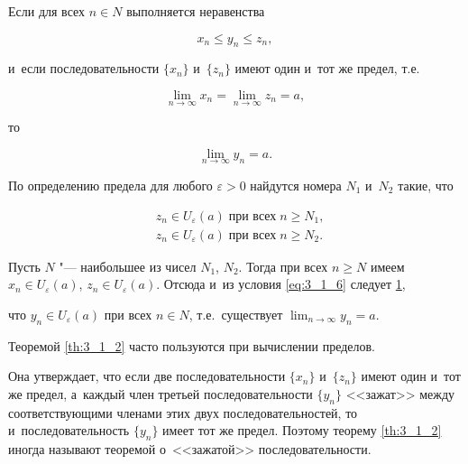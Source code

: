 
\begin{Th}\label{th:3_1_2}
Если  для всех $n \in N$ выполняется неравенства

\begin{equation}\label{eq:3_1_6}
x_{n} \leqslant y_{n} \leqslant z_{n},
\end{equation}

\noindent
и~если последовательности $\{x_{n}\}$ и~$\{z_{n}\}$ имеют один и~тот же предел,
т.е.\ 

\begin{equation*}
\displaystyle \lim_{n \to \infty} x_{n} = \lim_{n \to \infty} z_{n} = a, 
\end{equation*}

\noindent
то

\begin{equation*}
\displaystyle \lim_{n \to \infty} y_{n} = a.
\end{equation*}
\end{Th}

По определению предела для любого $\varepsilon > 0$ найдутся номера
$N_{1}$ и~$N_{2}$ такие, что

\begin{align*}
& z_{n} \in U_{\varepsilon}(a) \; \text{при всех} \; n \geqslant N_{1}, \\
& z_{n} \in U_{\varepsilon}(a) \; \text{при всех} \; n \geqslant N_{2}.
\end{align*}

\noindent
Пусть $N$ "--- наибольшее из чисел $N_{1}$, $N_{2}$.
Тогда при всех $n \geqslant N$ имеем
$x_{n} \in U_{\varepsilon}(a)$, $z_{n} \in U_{\varepsilon}(a)$.
Отсюда и~из условия \eqref{eq:3_1_6} следует \ref{fig:3_1_4},

\begin{figure}\label{fig:3_1_4}
\end{figure}

\noindent
что $y_{n} \in U_{\varepsilon}(a)$ при всех $n \in N$, т.е.\ существует
$\displaystyle \lim_{n \to \infty} y_{n} = a$.

\begin{Note}\label{nt:3_1_3}
Теоремой \ref{th:3_1_2} часто пользуются при вычислении пределов.

Она утверждает, что если две последовательности $\{x_{n}\}$ и~$\{z_{n}\}$
имеют один и~тот же предел, а~каждый член третьей последовательности $\{y_{n}\}$
<<зажат>> между соответствующими членами этих двух последовательностей,
то и~последовательность $\{y_{n}\}$ имеет тот же предел.
Поэтому теорему \ref{th:3_1_2} иногда называют теоремой о~<<зажатой>>
последовательности.
\end{Note}

